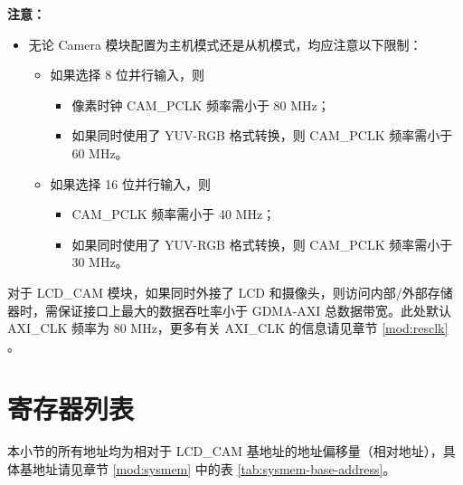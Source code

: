 \documentclass[main\_\_CN.tex]{subfiles}
\begin{document}
\textbf{注意：}
\begin{itemize}
    \item 无论 Camera 模块配置为主机模式还是从机模式，均应注意以下限制：
\begin{itemize}

    \item 如果选择 8 位并行输入，则
        \begin{itemize}
        \item 像素时钟 CAM\_PCLK 频率需小于 80 MHz；
        \item 如果同时使用了 YUV-RGB 格式转换，则 CAM\_PCLK 频率需小于 60 MHz。
    \end{itemize}
    \item 如果选择 16 位并行输入，则
        \begin{itemize}
        \item CAM\_PCLK 频率需小于 40 MHz；
        \item 如果同时使用了 YUV-RGB 格式转换，则 CAM\_PCLK 频率需小于 30 MHz。
    \end{itemize}

\end{itemize}
\end{itemize}

\begin{tiplisting}
对于 LCD\_CAM 模块，如果同时外接了 LCD 和摄像头，则访问内部/外部存储器时，需保证接口上最大的数据吞吐率小于 GDMA-AXI 总数据带宽。此处默认 AXI\_CLK 频率为 80 MHz，更多有关 AXI\_CLK 的信息请见章节 \ref{mod:resclk} \textit{}。
\end{tiplisting}




\newpage
\hypertarget{camlcdctrl-reg-summ}{}
\section{寄存器列表}
\label{sec:camlcdctrl-reg-summ}

本小节的所有地址均为相对于 LCD\_CAM 基地址的地址偏移量（相对地址），具体基地址请见章节 \ref{mod:sysmem} \textit{} 中的表 \ref{tab:sysmem-base-address}。
\end{document}
